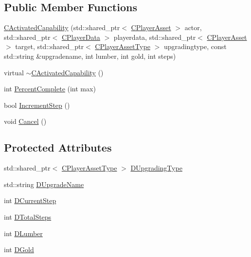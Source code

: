 \subsection*{Public Member Functions}
\begin{DoxyCompactItemize}
\item 
\hyperlink{classCPlayerCapabilityUnitUpgrade_1_1CActivatedCapability_a567ef5f24fbf77a0be2d7340cd980c4a}{C\+Activated\+Capability} (std\+::shared\+\_\+ptr$<$ \hyperlink{classCPlayerAsset}{C\+Player\+Asset} $>$ actor, std\+::shared\+\_\+ptr$<$ \hyperlink{classCPlayerData}{C\+Player\+Data} $>$ playerdata, std\+::shared\+\_\+ptr$<$ \hyperlink{classCPlayerAsset}{C\+Player\+Asset} $>$ target, std\+::shared\+\_\+ptr$<$ \hyperlink{classCPlayerAssetType}{C\+Player\+Asset\+Type} $>$ upgradingtype, const std\+::string \&upgradename, int lumber, int gold, int steps)
\item 
virtual \hyperlink{classCPlayerCapabilityUnitUpgrade_1_1CActivatedCapability_a4402be13dd341fdc5a2612732c6d2b39}{$\sim$\+C\+Activated\+Capability} ()
\item 
int \hyperlink{classCPlayerCapabilityUnitUpgrade_1_1CActivatedCapability_a16026f30b1ec10fbd4cb7049d0b74719}{Percent\+Complete} (int max)
\item 
bool \hyperlink{classCPlayerCapabilityUnitUpgrade_1_1CActivatedCapability_a86833312cb2f2460e923808fe0e19223}{Increment\+Step} ()
\item 
void \hyperlink{classCPlayerCapabilityUnitUpgrade_1_1CActivatedCapability_a29b41666081cf420e9f3b7d93c09920b}{Cancel} ()
\end{DoxyCompactItemize}
\subsection*{Protected Attributes}
\begin{DoxyCompactItemize}
\item 
std\+::shared\+\_\+ptr$<$ \hyperlink{classCPlayerAssetType}{C\+Player\+Asset\+Type} $>$ \hyperlink{classCPlayerCapabilityUnitUpgrade_1_1CActivatedCapability_a028e222f2adc8a1035090487c93b358b}{D\+Upgrading\+Type}
\item 
std\+::string \hyperlink{classCPlayerCapabilityUnitUpgrade_1_1CActivatedCapability_acb0261591d692393b3c864d75edc799f}{D\+Upgrade\+Name}
\item 
int \hyperlink{classCPlayerCapabilityUnitUpgrade_1_1CActivatedCapability_a3ffaf9372ee622c3ef439396dfd00db6}{D\+Current\+Step}
\item 
int \hyperlink{classCPlayerCapabilityUnitUpgrade_1_1CActivatedCapability_a56d9f9fd76c8757955e84ae8f56d5337}{D\+Total\+Steps}
\item 
int \hyperlink{classCPlayerCapabilityUnitUpgrade_1_1CActivatedCapability_aa4de5f57ea9d8dd85d7e6f62015c4a8d}{D\+Lumber}
\item 
int \hyperlink{classCPlayerCapabilityUnitUpgrade_1_1CActivatedCapability_a259a99f41ef918edf79f6827dec06559}{D\+Gold}
\end{DoxyCompactItemize}


